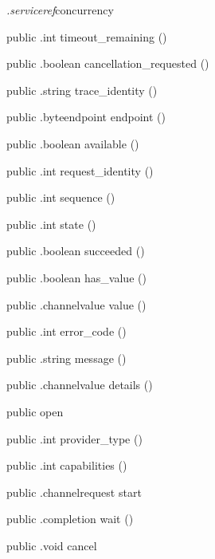 \begin{CrexxClass}{\textit{.serviceref}}{concurrency}
\begin{Members}
    \Method
      {public}
      {.int}
      {timeout\_remaining}
      {()}

    \Method
      {public}
      {.boolean}
      {cancellation\_requested}
      {()}

    \Method
      {public}
      {.string}
      {trace\_identity}
      {()}

    \Method
      {public}
      {.byteendpoint}
      {endpoint}
      {()}

    \Method
      {public}
      {.boolean}
      {available}
      {()}

    \Method
      {public}
      {.int}
      {request\_identity}
      {()}

    \Method
      {public}
      {.int}
      {sequence}
      {()}

    \Method
      {public}
      {.int}
      {state}
      {()}

    \Method
      {public}
      {.boolean}
      {succeeded}
      {()}

    \Method
      {public}
      {.boolean}
      {has\_value}
      {()}

    \Method
      {public}
      {.channelvalue}
      {value}
      {()}

    \Method
      {public}
      {.int}
      {error\_code}
      {()}

    \Method
      {public}
      {.string}
      {message}
      {()}

    \Method
      {public}
      {.channelvalue}
      {details}
      {()}

    \Factory
      {public}
      {open}
      {}

    \Method
      {public}
      {.int}
      {provider\_type}
      {()}

    \Method
      {public}
      {.int}
      {capabilities}
      {()}

    \Method
      {public}
      {.channelrequest}
      {start}
      {}

    \Method
      {public}
      {.completion}
      {wait}
      {()}

    \Method
      {public}
      {.void}
      {cancel}
      {}


\end{Members}
\end{CrexxClass}
